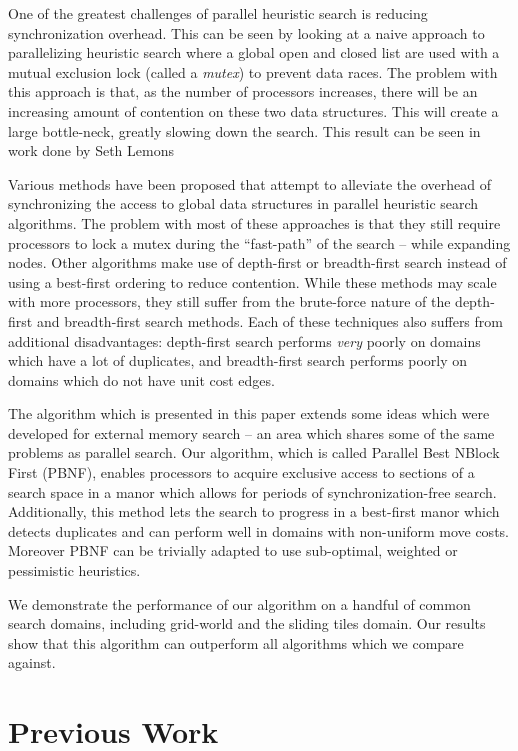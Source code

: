 \documentclass{article}
\begin{document}
One of the greatest challenges of parallel heuristic search is
reducing synchronization overhead.  This can be seen by looking at a
naive approach to parallelizing heuristic search where a global open
and closed list are used with a mutual exclusion lock (called a
\emph{mutex}) to prevent data races.  The problem with this approach
is that, as the number of processors increases, there will be an
increasing amount of contention on these two data structures.  This
will create a large bottle-neck, greatly slowing down the search.
This result can be seen in work done by Seth Lemons \cite{lemons:sur}

Various methods have been proposed that attempt to alleviate the
overhead of synchronizing the access to global data structures in
parallel heuristic search algorithms.  The problem with most of these
approaches is that they still require processors to lock a mutex
during the ``fast-path'' of the search -- while expanding nodes.
Other algorithms make use of depth-first or breadth-first search
instead of using a best-first ordering to reduce contention.  While
these methods may scale with more processors, they still suffer from
the brute-force nature of the depth-first and breadth-first search
methods.  Each of these techniques also suffers from additional
disadvantages: depth-first search performs \emph{very} poorly on
domains which have a lot of duplicates, and breadth-first search
performs poorly on domains which do not have unit cost edges.

The algorithm which is presented in this paper extends some ideas
which were developed for external memory search -- an area which
shares some of the same problems as parallel search.  Our algorithm,
which is called Parallel Best NBlock First (PBNF), enables processors
to acquire exclusive access to sections of a search space in a manor
which allows for periods of synchronization-free search.
Additionally, this method lets the search to progress in a best-first
manor which detects duplicates and can perform well in domains with
non-uniform move costs.  Moreover PBNF can be trivially adapted to use
sub-optimal, weighted or pessimistic heuristics.

We demonstrate the performance of our algorithm on a handful of common
search domains, including grid-world and the sliding tiles domain.
Our results show that this algorithm can outperform all algorithms
which we compare against.

\section{Previous Work}
\end{document}
